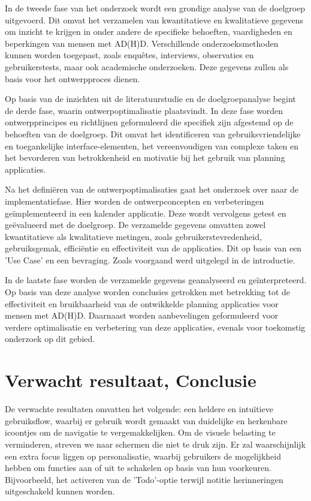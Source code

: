 In de tweede fase van het onderzoek wordt een grondige analyse van de doelgroep uitgevoerd. Dit omvat het verzamelen van kwantitatieve en kwalitatieve gegevens om inzicht te krijgen in onder andere de specifieke behoeften, vaardigheden en beperkingen van mensen met AD(H)D. Verschillende onderzoeksmethoden kunnen worden toegepast, zoals enquêtes, interviews, observaties en gebruikerstests, maar ook academische onderzoeken. Deze gegevens zullen als basis voor het ontwerpproces dienen. \newline 

Op basis van de inzichten uit de literatuurstudie en de doelgroepanalyse begint de derde fase, waarin ontwerpoptimalisatie plaatsvindt. In deze fase worden ontwerpprincipes en richtlijnen geformuleerd die specifiek zijn afgestemd op de behoeften van de doelgroep. Dit omvat het identificeren van gebruiksvriendelijke en toegankelijke interface-elementen, het vereenvoudigen van complexe taken en het bevorderen van betrokkenheid en motivatie bij het gebruik van planning applicaties. \newline 

Na het definiëren van de ontwerpoptimalisaties gaat het onderzoek over naar de implementatiefase. Hier worden de ontwerpconcepten en verbeteringen geïmplementeerd in een kalender applicatie. Deze wordt vervolgens getest en geëvalueerd met de doelgroep. De verzamelde gegevens omvatten zowel kwantitatieve als kwalitatieve metingen, zoals gebruikerstevredenheid, gebruiksgemak, efficiëntie en effectiviteit van de applicaties.  
Dit op basis van een 'Use Case' en een bevraging. Zoals voorgaand werd uitgelegd in de introductie. \newline 

In de laatste fase worden de verzamelde gegevens geanalyseerd en geïnterpreteerd. Op basis van deze analyse worden conclusies getrokken met betrekking tot de effectiviteit en bruikbaarheid van de ontwikkelde planning applicaties voor mensen met AD(H)D. Daarnaast worden aanbevelingen geformuleerd voor verdere optimalisatie en verbetering van deze applicaties, evenals voor toekomstig onderzoek op dit gebied.


\section{Verwacht resultaat, Conclusie}%
\label{sec:verwachte_resultaten_conclusie}

De verwachte resultaten omvatten het volgende: een heldere en intuïtieve gebruiksflow, waarbij er gebruik wordt gemaakt van duidelijke en herkenbare icoontjes om de navigatie te vergemakkelijken. Om de visuele belasting te verminderen, streven we naar schermen die niet te druk zijn. \newline
Er zal waarschijnlijk een extra focus liggen op personalisatie, waarbij gebruikers de mogelijkheid hebben om functies aan of uit te schakelen op basis van hun voorkeuren. Bijvoorbeeld, het activeren van de 'Todo'-optie terwijl notitie herinneringen uitgeschakeld kunnen worden. \newline

